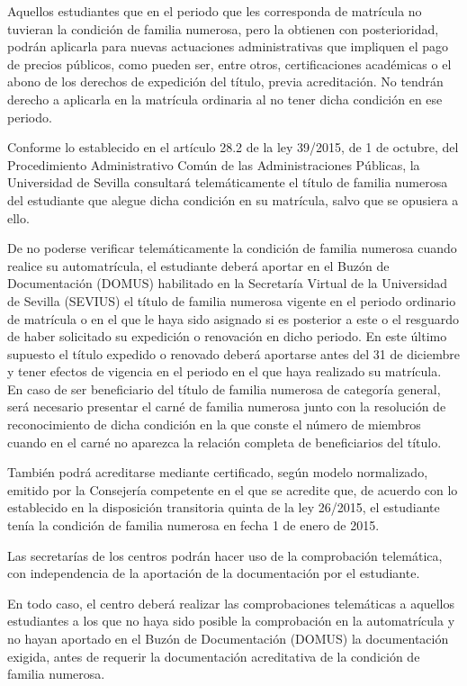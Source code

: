 \documentclass{article}
\begin{document}
\begin{itemize}
\begin{itemize}
\begin{scriptsize}
                  Aquellos estudiantes que en el periodo que les corresponda de matrícula no tuvieran la condición de familia numerosa, pero la obtienen con posterioridad, podrán aplicarla para nuevas actuaciones administrativas que impliquen el pago de precios públicos, como pueden ser, entre otros, certificaciones académicas o el abono de los derechos de expedición del título, previa acreditación. No tendrán derecho a aplicarla en la matrícula ordinaria al no tener dicha condición en ese periodo.

                  Conforme lo establecido en el artículo 28.2 de la ley 39/2015, de 1 de octubre, del Procedimiento Administrativo Común de las Administraciones Públicas, la Universidad de Sevilla consultará telemáticamente el título de familia numerosa del estudiante que alegue dicha condición en su matrícula, salvo que se opusiera a ello.

                  De no poderse verificar telemáticamente la condición de familia numerosa cuando realice su automatrícula, el estudiante deberá aportar en el Buzón de Documentación (DOMUS) habilitado en la Secretaría Virtual de la Universidad de Sevilla (SEVIUS) el título de familia numerosa vigente en el periodo ordinario de matrícula o en el que le haya sido asignado si es posterior a este o el resguardo de haber solicitado su expedición o renovación en dicho periodo. En este último supuesto el título expedido o renovado deberá aportarse antes del 31 de diciembre y tener efectos de vigencia en el periodo en el que haya realizado su matrícula. En caso de ser beneficiario del título de familia numerosa de categoría general, será necesario presentar el carné de familia numerosa junto con la resolución de reconocimiento de dicha condición en la que conste el número de miembros cuando en el carné no aparezca la relación completa de beneficiarios del título.

                  También podrá acreditarse mediante certificado, según modelo normalizado, emitido por la Consejería competente en el que se acredite que, de acuerdo con lo establecido en la disposición transitoria quinta de la ley 26/2015, el estudiante tenía la condición de familia numerosa en fecha 1 de enero de 2015.

                  Las secretarías de los centros podrán hacer uso de la comprobación telemática, con independencia de la aportación de la documentación por el estudiante.

                  En todo caso, el centro deberá realizar las comprobaciones telemáticas a aquellos estudiantes a los que no haya sido posible la comprobación en la automatrícula y no hayan aportado en el Buzón de Documentación (DOMUS) la documentación exigida, antes de requerir la documentación acreditativa de la condición de familia numerosa.


\end{scriptsize}
\end{itemize}
\end{itemize}
\end{document}
